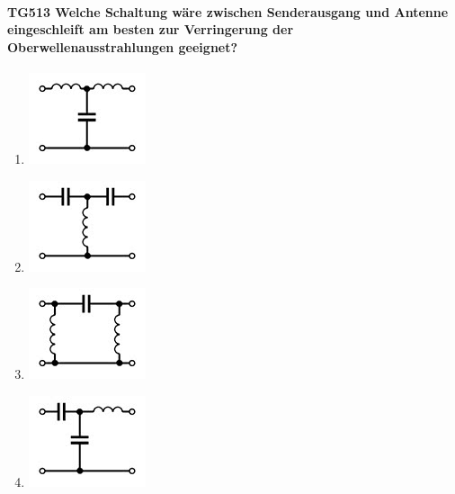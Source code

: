 \documentclass[8pt]{article}
\begin{document}
\paragraph*{TG513 Welche Schaltung wäre zwischen Senderausgang und Antenne eingeschleift am besten zur Verringerung der Oberwellenausstrahlungen geeignet?}
\begin{enumerate}[nolistsep,label=\Alph*]
\item
\begin{center}
	\begin{minipage}{\linewidth}
		\centering
		\includegraphics[scale=1.0]{pics/tg513_a.jpg}
	\end{minipage}
\end{center}
\item
\begin{center}
	\begin{minipage}{\linewidth}
		\centering
		\includegraphics[scale=1.0]{pics/tg513_b.jpg}
	\end{minipage}
\end{center}
\item
\begin{center}
	\begin{minipage}{\linewidth}
		\centering
		\includegraphics[scale=1.0]{pics/tg513_c.jpg}
	\end{minipage}
\end{center}
\item
\begin{center}
	\begin{minipage}{\linewidth}
		\centering
		\includegraphics[scale=1.0]{pics/tg513_d.jpg}
	\end{minipage}
\end{center}
\end{enumerate}
\end{document}
